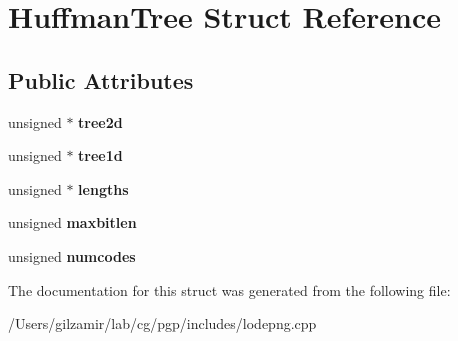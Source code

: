\hypertarget{struct_huffman_tree}{}\section{Huffman\+Tree Struct Reference}
\label{struct_huffman_tree}
\subsection*{Public Attributes}
\begin{DoxyCompactItemize}
\item 
\mbox{\label{struct_huffman_tree_a91160304cb771d2f9f39ee357c9b05a8}} 
unsigned $\ast$ {\bfseries tree2d}
\item 
\mbox{\label{struct_huffman_tree_a47b3346a25fe0a3222b595c236ad146e}} 
unsigned $\ast$ {\bfseries tree1d}
\item 
\mbox{\label{struct_huffman_tree_aef81d45a5c56276c5699a8e9a575021d}} 
unsigned $\ast$ {\bfseries lengths}
\item 
\mbox{\label{struct_huffman_tree_adf034ca9ce62a4ebfffaaeaba4378a26}} 
unsigned {\bfseries maxbitlen}
\item 
\mbox{\label{struct_huffman_tree_a608df5a24f60d1077a5cde19d5149e1f}} 
unsigned {\bfseries numcodes}
\end{DoxyCompactItemize}


The documentation for this struct was generated from the following file\+:\begin{DoxyCompactItemize}
\item 
/\+Users/gilzamir/lab/cg/pgp/includes/lodepng.\+cpp\end{DoxyCompactItemize}
